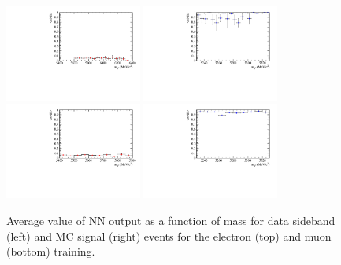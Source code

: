 \begin{figure}
\centering
\includegraphics[width=0.4\textwidth]{RKst/figs/Training/EE_wNB_vs_MPV_bkg.pdf}
\includegraphics[width=0.4\textwidth]{RKst/figs/Training/EE_wNB_vs_MPV_sgn.pdf}
\includegraphics[width=0.4\textwidth]{RKst/figs/Training/MM_wNB_vs_MPV_bkg.pdf}
\includegraphics[width=0.4\textwidth]{RKst/figs/Training/MM_wNB_vs_MPV_sgn.pdf}
\caption{Average value of NN output as a function of \Bz mass for data
sideband (left) and MC signal (right) events for the electron (top) and muon (bottom) training.}
\label{fig:RKst_NNprofiles}
\end{figure}
%
